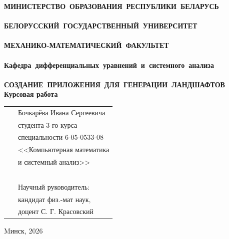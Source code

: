 \setcounter{page}{1}
\thispagestyle{empty}
\begin{center}
\bf
\vspace{4cm}
{
\mbox{МИНИСТЕРСТВО~ОБРАЗОВАНИЯ~РЕСПУБЛИКИ~БЕЛАРУСЬ} \\~\\
\mbox{БЕЛОРУССКИЙ~ГОСУДАРСТВЕННЫЙ~УНИВЕРСИТЕТ} \\~\\
\mbox{МЕХАНИКО-МАТЕМАТИЧЕСКИЙ~ФАКУЛЬТЕТ} \\~\\
\mbox{Кафедра~дифференциальных~уравнений~и~системного~анализа} \\~\\
}
\vspace{4cm}
\bf
\mbox{СОЗДАНИЕ ПРИЛОЖЕНИЯ ДЛЯ ГЕНЕРАЦИИ ЛАНДШАФТОВ}\\
\vspace{1cm}
\rm Курсовая работа 
\vspace{3cm}
\end{center}
\begin{tabular}{ll}
\hspace{10.5cm}
&Бочкарёва Ивана Сергеевича~\\
&студента 3-го курса\\
&специальности 6-05-0533-08\\
&<<Компьютерная математика\\
&и системный анализ>>\\~\\
&Научный руководитель:\\
&кандидат физ.-мат наук,\\
& доцент С. Г. Красовский
\end{tabular}
\vspace{3cm}
\begin{center}
Mинск, 2026
\end{center}
\clearpage
\restoregeometry